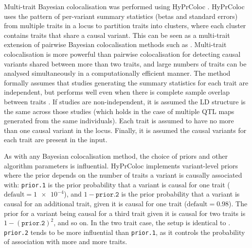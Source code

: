 Multi-trait Bayesian colocalisation was performed using {HyPrColoc} \autocite{foley2019FastEfficientColocalization}.
{HyPrColoc} uses the pattern of per-variant summary statistics (betas and standard errors) from multiple traits in a locus to partition traits into clusters, where each cluster contains traits that share a causal variant.
This can be seen as a multi-trait extension of pairwise Bayesian colocalisation methods such as  \autocite{giambartolomei2014BayesianTestColocalisation}.
Multi-trait colocalisation is more powerful than pairwise colocalisation for detecting causal variants shared between more than two traits,
and large numbers of traits can be analysed simultaneously in a computationally efficient manner.
The method formally assumes that studies generating the summary statistics for each trait are independent,
but performs well even when there is complete sample overlap between traits \autocite{foley2019FastEfficientColocalization}.
If studies are non-independent, 
it is assumed the \gls{LD} structure is the same across those studies (which holds in the case of multiple \gls{QTL} maps generated from the same individuals).
Each trait is assumed to have no more than one causal variant in the locus.
Finally, it is assumed the causal variants for each trait are present in the input.

As with any Bayesian colocalisation method, the choice of priors and other algorithm parameters is influential.
{HyPrColoc} implements variant-level priors where the prior depends on the number of traits a variant is causally associated with:
\texttt{prior.1} is the prior probability that a variant is causal for one trait ($\text{default} = \num{1e-4}$),
and $1 - \texttt{prior.2}$ is the prior probability that a variant is causal for an additional trait, given it is causal for one trait ($\text{default} = 0.98$).
The prior for a variant being causal for a third trait given it is causal for two traits is $1-(\texttt{prior.2})^2$, and so on.
In the two trait case, the setup is identical to  \autocite{giambartolomei2014BayesianTestColocalisation}.
\texttt{prior.2} tends to be more influential than \texttt{prior.1}, as it controls the probability of association with more and more traits.

